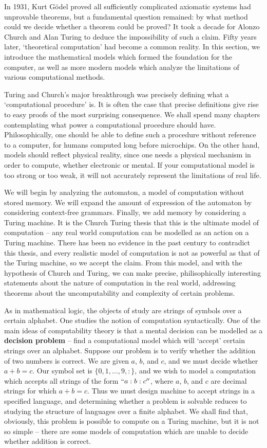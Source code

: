 In 1931, Kurt G\"{o}del proved all sufficiently complicated axiomatic systems had unprovable theorems, but a fundamental question remained: by what method could we decide whether a theorem could be proved? It took a decade for Alonzo Church and Alan Turing to deduce the impossibility of such a claim. Fifty years later, `theoretical computation' had become a common reality. In this section, we introduce the mathematical models which formed the foundation for the computer, as well as more modern models which analyze the limitations of various computational methods.

Turing and Church's major breakthrough was precisely defining what a `computational procedure' is. It is often the case that precise definitions give rise to easy proofs of the most surprising consequence. We shall spend many chapters contemplating what power a computational procedure should have. Philosophically, one should be able to define such a procedure without reference to a computer, for humans computed long before microchips. On the other hand, models should reflect physical reality, since one needs a physical mechanism in order to compute, whether electronic or mental. If your computational model is too strong or too weak, it will not accurately represent the limitations of real life.

We will begin by analyzing the automaton, a model of computation without stored memory. We will expand the amount of expression of the automaton by considering context-free grammars. Finally, we add memory by considering a Turing machine. It is the Church Turing thesis that this is the ultimate model of computation -- any real world computation can be modelled as an action on a Turing machine. There has been no evidence in the past century to contradict this thesis, and every realistic model of computation is not as powerful as that of the Turing machine, so we accept the claim. From this model, and with the hypothesis of Church and Turing, we can make precise, philisophically interesting statements about the nature of computation in the real world, addressing theorems about the uncomputability and complexity of certain problems.

As in mathematical logic, the objects of study are strings of symbols over a certain alphabet. One studies the notion of computation syntactically. One of the main ideas of computability theory is that a mental decision can be modelled as a {\bf decision problem} -- find a computational model which will `accept' certain strings over an alphabet. Suppose our problem is to verify whether the addition of two numbers is correct. We are given $a$, $b$, and $c$, and we must decide whether $a + b = c$. Our symbol set is $\{ 0, 1, \dots, 9, : \}$, and we wish to model a computation which accepts all strings of the form $``a:b:c''$, where $a$, $b$, and $c$ are decimal strings for which $a + b = c$. Thus we must design machine to accept strings in a specified language, and determining whether a problem is solvable reduces to studying the structure of languages over a finite alphabet. We shall find that, obviously, this problem is possible to compute on a Turing machine, but it is not so simple -- there are some models of computation which are unable to decide whether addition is correct.

